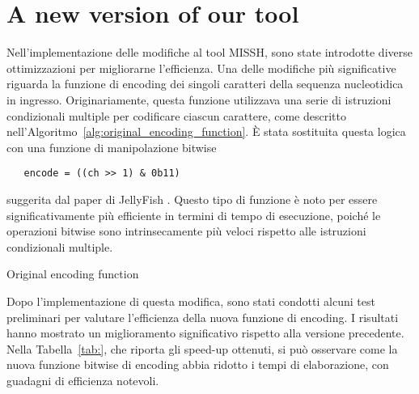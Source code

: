 \chapter{A new version of our tool}
\label{chp:develop}

Nell'implementazione delle modifiche al tool \acs{MISSH}, sono state introdotte diverse ottimizzazioni per migliorarne l'efficienza. Una delle modifiche più significative riguarda la funzione di encoding dei singoli caratteri della sequenza nucleotidica in ingresso. Originariamente, questa funzione utilizzava una serie di istruzioni condizionali multiple per codificare ciascun carattere, come descritto nell'Algoritmo~\ref{alg:original_encoding_function}. È stata sostituita questa logica con una funzione di manipolazione bitwise
\begin{verbatim}
   encode = ((ch >> 1) & 0b11)
\end{verbatim}
suggerita dal paper di JellyFish \cite{marcais2011jellyfish}. Questo tipo di funzione è noto per essere significativamente più efficiente in termini di tempo di esecuzione, poiché le operazioni bitwise sono intrinsecamente più veloci rispetto alle istruzioni condizionali multiple.

\begin{algorithm}[!ht]
	\caption{Original encoding function}
	\label{alg:original_encoding_function}
	
\end{algorithm}

Dopo l'implementazione di questa modifica, sono stati condotti alcuni test preliminari per valutare l'efficienza della nuova funzione di encoding. I risultati hanno mostrato un miglioramento significativo rispetto alla versione precedente. Nella Tabella~\ref{tab:}, che riporta gli speed-up ottenuti, si può osservare come la nuova funzione bitwise di encoding abbia ridotto i tempi di elaborazione, con guadagni di efficienza notevoli.

